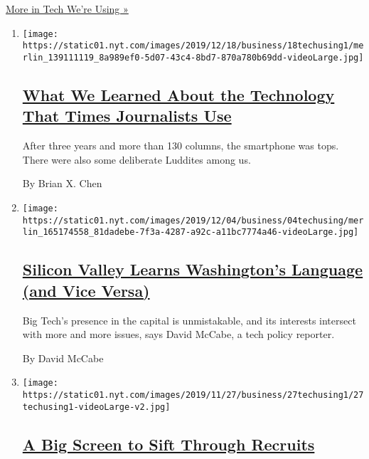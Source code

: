 \href{/column/tech-we-are-using}{More in Tech We're Using »}

\begin{enumerate}
\def\labelenumi{\arabic{enumi}.}
\item
  \texttt{[image: https://static01.nyt.com/images/2019/12/18/business/18techusing1/merlin\_139111119\_8a989ef0-5d07-43c4-8bd7-870a780b69dd-videoLarge.jpg]}

  \hypertarget{what-we-learned-about-the-technology-that-times-journalists-use}{%
  \subsection{\texorpdfstring{\href{/2019/12/18/technology/personaltech/technology-times-journalists-use.html}{What
  We Learned About the Technology That Times Journalists
  Use}}{What We Learned About the Technology That Times Journalists Use}}\label{what-we-learned-about-the-technology-that-times-journalists-use}}

  After three years and more than 130 columns, the smartphone was tops.
  There were also some deliberate Luddites among us.

  By Brian X. Chen
\item
  \texttt{[image: https://static01.nyt.com/images/2019/12/04/business/04techusing/merlin\_165174558\_81dadebe-7f3a-4287-a92c-a11bc7774a46-videoLarge.jpg]}

  \hypertarget{silicon-valley-learns-washingtons-language-and-vice-versa}{%
  \subsection{\texorpdfstring{\href{/2019/12/04/technology/personaltech/silicon-valley-washington.html}{Silicon
  Valley Learns Washington's Language (and Vice
  Versa)}}{Silicon Valley Learns Washington's Language (and Vice Versa)}}\label{silicon-valley-learns-washingtons-language-and-vice-versa}}

  Big Tech's presence in the capital is unmistakable, and its interests
  intersect with more and more issues, says David McCabe, a tech policy
  reporter.

  By David McCabe
\item
  \texttt{[image: https://static01.nyt.com/images/2019/11/27/business/27techusing1/27techusing1-videoLarge-v2.jpg]}

  \hypertarget{a-big-screen-to-sift-through-recruits}{%
  \subsection{\texorpdfstring{\href{/2019/11/27/technology/personaltech/young-tech-users.html}{A
  Big Screen to Sift Through
  Recruits}}{A Big Screen to Sift Through Recruits}}\label{a-big-screen-to-sift-through-recruits}}


\end{enumerate}
